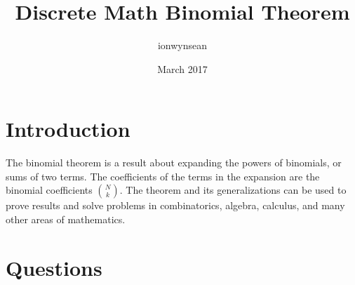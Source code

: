 \documentclass{article}
\title{Discrete Math Binomial Theorem}
\author{ionwynsean }
\date{March 2017}
\begin{document}
\maketitle

\section{Introduction}
The binomial theorem is a result about expanding the powers of binomials, or sums of two terms. The coefficients of the terms in the expansion are the binomial coefficients  \( {N}\choose{k} \). The theorem and its generalizations can be used to prove results and solve problems in combinatorics, algebra, calculus, and many other areas of mathematics.

\section{Questions}
\end{document}
